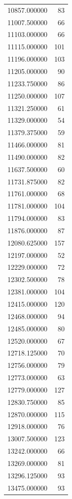 \begin{tabular}{lr}
10857.000000  &    83 \\
11007.500000  &    66 \\
11103.000000  &    66 \\
11115.000000  &   101 \\
11196.000000  &   103 \\
11205.000000  &    90 \\
11233.750000  &    86 \\
11250.000000  &   107 \\
11321.250000  &    61 \\
11329.000000  &    54 \\
11379.375000  &    59 \\
11466.000000  &    81 \\
11490.000000  &    82 \\
11637.500000  &    60 \\
11731.875000  &    82 \\
11761.000000  &    68 \\
11781.000000  &   104 \\
11794.000000  &    83 \\
11876.000000  &    87 \\
12080.625000  &   157 \\
12197.000000  &    52 \\
12229.000000  &    72 \\
12302.500000  &    78 \\
12381.000000  &   104 \\
12415.000000  &   120 \\
12468.000000  &    94 \\
12485.000000  &    80 \\
12520.000000  &    67 \\
12718.125000  &    70 \\
12756.000000  &    79 \\
12773.000000  &    63 \\
12779.000000  &   127 \\
12830.750000  &    85 \\
12870.000000  &   115 \\
12918.000000  &    76 \\
13007.500000  &   123 \\
13242.000000  &    66 \\
13269.000000  &    81 \\
13296.125000  &    93 \\
13475.000000  &    93 \\

\end{tabular}
